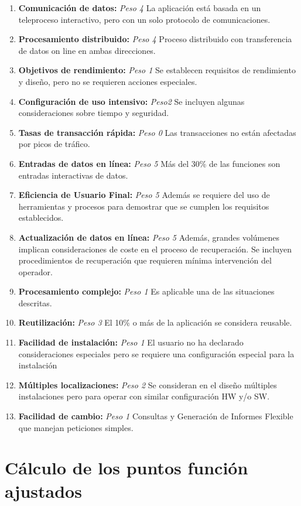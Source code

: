 \documentclass[11pt,a4paper,spanish,twoside]{book}
\begin{document}
\begin{enumerate}[{\bf 1.}]

\item {\bf Comunicación de datos:} \emph{Peso 4} La aplicación está basada en
  un teleproceso interactivo, pero con un solo protocolo de comunicaciones.

\item {\bf Procesamiento distribuido:} \emph{Peso 4} Proceso distribuido
  con transferencia de datos on line en ambas direcciones. 

\item {\bf Objetivos de rendimiento:} \emph{Peso 1} Se establecen requisitos
  de rendimiento y diseño, pero no se requieren acciones especiales.

\item {\bf Configuración de uso intensivo:} \emph{Peso2} Se incluyen algunas
  consideraciones sobre tiempo y seguridad. 

\item {\bf Tasas de transacción rápida:} \emph{Peso 0} Las transacciones no
  están afectadas por picos de tráfico. 

\item {\bf Entradas de datos en línea:} \emph{Peso 5} Más del 30\% de las
  funciones son entradas interactivas de datos. 

\item {\bf Eficiencia de Usuario Final:} \emph{Peso 5} Además se requiere del
  uso de herramientas y procesos para demostrar que se cumplen los requisitos
  establecidos.

\item {\bf Actualización de datos en línea:} \emph{Peso 5} Además, grandes
  volúmenes implican consideraciones de coste en el proceso de
  recuperación. Se incluyen procedimientos de recuperación que requieren
  mínima intervención del operador. 

\item {\bf Procesamiento complejo:} \emph{Peso 1} Es aplicable una de las
  situaciones descritas. 

\item {\bf Reutilización:} \emph{Peso 3} El 10\% o más de la aplicación se
  considera reusable. 

\item {\bf Facilidad de instalación:} \emph{Peso 1} El usuario no ha
  declarado consideraciones especiales pero se requiere una configuración
  especial para la instalación 

\item {\bf Múltiples localizaciones:} \emph{Peso 2} Se consideran en el diseño múltiples
  instalaciones pero para operar con similar configuración HW y/o SW.

\item {\bf Facilidad de cambio:} \emph{Peso 1} Consultas y Generación de
  Informes Flexible que manejan peticiones simples.

\end{enumerate}
\chapter{Cálculo de los puntos función ajustados}
\end{document}
